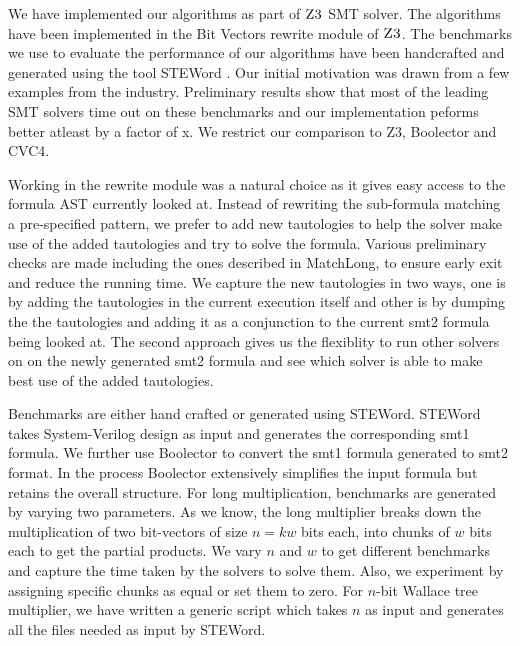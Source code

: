 


We have implemented our algorithms as part of $\textsc{Z3}$ \cite{z3} SMT solver. The algorithms have been implemented in the Bit Vectors rewrite module of $\textsc{Z3}$. The benchmarks we use to evaluate the performance of our algorithms have been handcrafted and generated using the tool STEWord \cite{Word-level Symbolic Trajectory Evaluation}. Our initial motivation was drawn from a few examples from the industry. Preliminary results show that most of the leading SMT solvers time out on these benchmarks and our implementation peforms better atleast by a factor of x. We restrict our comparison to Z3, Boolector\cite{Boolector} and CVC4\cite{cvc4}.

Working in the rewrite module was a natural choice as it gives easy access to the formula AST currently looked at. Instead of rewriting the sub-formula matching a pre-specified pattern, we prefer to add new tautologies to help the solver make use of the added tautologies and try to solve the formula. Various preliminary checks are made including the ones described in MatchLong, to ensure early exit and reduce the running time. We capture the new tautologies in two ways, one is by adding the tautologies in the current execution itself and other is by dumping the the tautologies and adding it as a conjunction to the current smt2 formula being looked at. The second approach gives us the flexiblity to run other solvers on on the newly generated smt2 formula and see which solver is able to make best use of the added tautologies.

Benchmarks are either hand crafted or generated using STEWord. STEWord takes System-Verilog design as input and generates the corresponding smt1 formula. We further use Boolector to convert the smt1 formula generated to smt2 format. In the process Boolector extensively simplifies the input formula but retains the overall structure. For long multiplication, benchmarks are generated by varying two parameters. As we know,
the long multiplier breaks down the multiplication of two bit-vectors of size $n = kw$ bits each,
into chunks of $w$ bits each to get the partial products. We vary $n$ and $w$ to get different benchmarks and capture the time taken by the solvers to solve them. Also, we experiment by assigning specific chunks as equal or set them to zero. For $n$-bit Wallace tree multiplier, we have written a generic script which takes $n$ as input and generates all the files needed as input by STEWord. 

